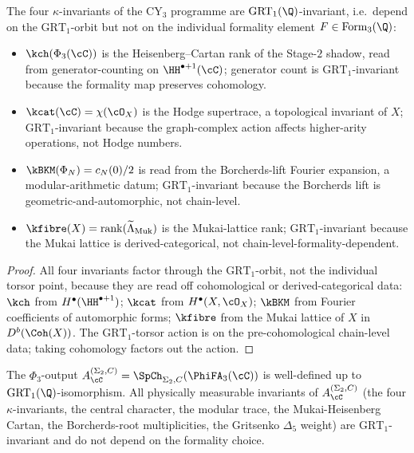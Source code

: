 \begin{proposition}
\label{prop:grt1-invariance-of-kappa-invariants}
\ClaimStatusTheorem
The four $\kappa$-invariants of the CY$_3$ programme are
$\mathrm{GRT}_1(\Q)$-invariant, i.e.\ depend on the $\mathrm{GRT}_1$-orbit
but not on the individual formality element $F \in \mathrm{Form}_3(\Q)$:
\begin{itemize}
\item $\kch(\Phi_3(\cC))$ is the Heisenberg--Cartan rank of the
Stage-$2$ shadow, read from generator-counting on $\HH^{\bullet+1}(\cC)$;
generator count is $\mathrm{GRT}_1$-invariant because the formality
map preserves cohomology.
\item $\kcat(\cC) = \chi(\cO_X)$ is the Hodge supertrace, a
topological invariant of $X$; $\mathrm{GRT}_1$-invariant because the
graph-complex action affects higher-arity operations, not Hodge
numbers.
\item $\kBKM(\Phi_N) = c_N(0)/2$ is read from the Borcherds-lift
Fourier expansion, a modular-arithmetic datum;
$\mathrm{GRT}_1$-invariant because the Borcherds lift is
geometric-and-automorphic, not chain-level.
\item $\kfibre(X) = \mathrm{rank}(\widetilde\Lambda_{\mathrm{Muk}})$ is
the Mukai-lattice rank; $\mathrm{GRT}_1$-invariant because the Mukai
lattice is derived-categorical, not chain-level-formality-dependent.
\end{itemize}
\end{proposition}

\begin{proof}
All four invariants factor through the $\mathrm{GRT}_1$-orbit, not the
individual torsor point, because they are read off cohomological
or derived-categorical data: $\kch$ from $H^\bullet(\HH^{\bullet+1})$;
$\kcat$ from $H^\bullet(X, \cO_X)$; $\kBKM$ from Fourier coefficients
of automorphic forms; $\kfibre$ from the Mukai lattice of $X$ in
$D^b(\Coh(X))$. The $\mathrm{GRT}_1$-torsor action is on the
pre-cohomological chain-level data; taking cohomology factors out the
action.
\end{proof}

\begin{corollary}
\label{cor:phi3-physical-well-definedness}
\ClaimStatusTheorem
The $\Phi_3$-output $A_\cC^{(\Sigma_2, C)} = \SpCh_{\Sigma_2, C}
(\PhiFA_3(\cC))$ is well-defined up to $\mathrm{GRT}_1(\Q)$-isomorphism.
All physically measurable invariants of $A_\cC^{(\Sigma_2, C)}$ (the
four $\kappa$-invariants, the central character, the modular trace,
the Mukai-Heisenberg Cartan, the Borcherds-root multiplicities, the
Gritsenko $\Delta_5$ weight) are $\mathrm{GRT}_1$-invariant and do not
depend on the formality choice.
\end{corollary}


